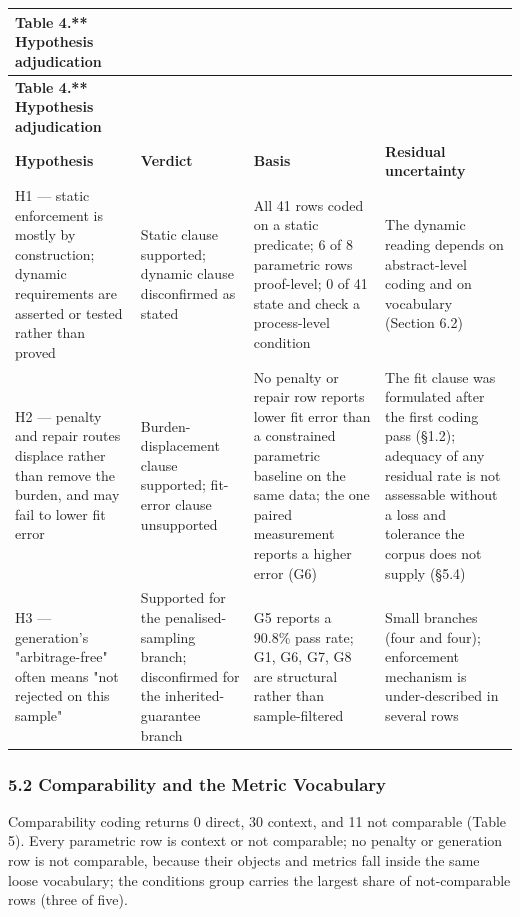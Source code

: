 \documentclass[11pt]{article}
\begin{document}
\begingroup
\begin{longtable}{@{}p{}p{}p{}p{}@{}}
\toprule
\textbf{Table 4.** Hypothesis adjudication} & \textbf{} & \textbf{} & \textbf{} \\
\midrule
\endfirsthead
\toprule
\textbf{Table 4.** Hypothesis adjudication} & \textbf{} & \textbf{} & \textbf{} \\
\midrule
\endhead
\textbf{Hypothesis} & \textbf{Verdict} & \textbf{Basis} & \textbf{Residual uncertainty} \\
H1 — static enforcement is mostly by construction; dynamic requirements are asserted or tested rather than proved & Static clause supported; dynamic clause disconfirmed as stated & All 41 rows coded on a static predicate; 6 of 8 parametric rows proof-level; 0 of 41 state and check a process-level condition & The dynamic reading depends on abstract-level coding and on vocabulary (Section 6.2) \\
H2 — penalty and repair routes displace rather than remove the burden, and may fail to lower fit error & Burden-displacement clause supported; fit-error clause unsupported & No penalty or repair row reports lower fit error than a constrained parametric baseline on the same data; the one paired measurement reports a higher error (G6) & The fit clause was formulated after the first coding pass (\S 1.2); adequacy of any residual rate is not assessable without a loss and tolerance the corpus does not supply (\S 5.4) \\
H3 — generation's "arbitrage-free" often means "not rejected on this sample" & Supported for the penalised-sampling branch; disconfirmed for the inherited-guarantee branch & G5 reports a 90.8\% pass rate; G1, G6, G7, G8 are structural rather than sample-filtered & Small branches (four and four); enforcement mechanism is under-described in several rows \\
\bottomrule
\end{longtable}
\endgroup

\subsubsection*{5.2 Comparability and the Metric Vocabulary}
Comparability coding returns 0 direct, 30 context, and 11 not comparable (Table 5). Every parametric row is context or not comparable; no penalty or generation row is not comparable, because their objects and metrics fall inside the same loose vocabulary; the conditions group carries the largest share of not-comparable rows (three of five).
\end{document}
